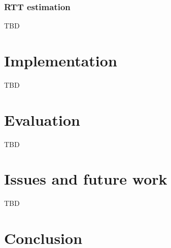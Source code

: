 \documentclass[10pt]{proc}
\begin{document}

\subsubsection{RTT estimation}
TBD

\section{Implementation}
TBD

\section{Evaluation}
TBD

\section{Issues and future work}
TBD

\section{Conclusion}
\end{document}
